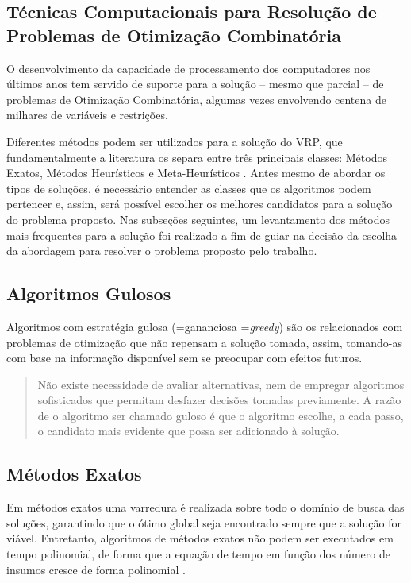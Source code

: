 \subsection{Técnicas Computacionais para Resolução de Problemas de Otimização Combinatória}
\label{tecnicas-computacionais}
O desenvolvimento da capacidade de processamento dos computadores nos últimos anos tem servido de suporte para a solução -- mesmo que parcial -- de problemas de Otimização Combinatória, algumas vezes envolvendo centena de milhares de variáveis e restrições.

Diferentes métodos podem ser utilizados para a solução do VRP, que fundamentalmente a literatura os separa entre três principais classes: Métodos Exatos, Métodos Heurísticos e Meta-Heurísticos \cite{maxwell}. Antes mesmo de abordar os tipos de soluções, é necessário entender as classes que os algoritmos podem pertencer e, assim, será possível escolher os melhores candidatos para a solução do problema proposto. Nas subseções seguintes, um levantamento dos métodos mais frequentes para a solução foi realizado a fim de guiar na decisão da escolha da abordagem para resolver o problema proposto pelo trabalho.

\subsection{Algoritmos Gulosos}
\label{gulosos}
Algoritmos com estratégia gulosa (=gananciosa =\emph{greedy}) \cite{feofiloff} são os relacionados com problemas de otimização que não repensam a solução tomada, assim, tomando-as com base na informação disponível sem se preocupar com efeitos futuros. 

\begin{quote}
Não existe necessidade de avaliar alternativas, nem de empregar algoritmos sofisticados que permitam desfazer decisões tomadas previamente. A razão de o algoritmo ser chamado guloso é que o algoritmo escolhe, a cada passo, o candidato mais evidente que possa ser adicionado à solução.
\end{quote}

\subsection{Métodos Exatos} \label{metodos-exatos}

Em métodos exatos uma varredura é realizada sobre todo o domínio de busca das soluções, garantindo que o ótimo global seja encontrado sempre que a solução for viável. Entretanto, algoritmos de métodos exatos não podem ser executados em tempo polinomial, de forma que a equação de tempo em função dos número de insumos cresce de forma polinomial \cite{maxwell}. 

